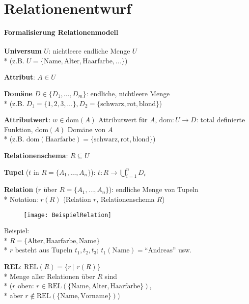 \section{Relationenentwurf}
\label{sec:relationenentwurf}

\paragraph{Formalisierung Relationenmodell}
\begin{items}
	\item \textbf{Universum} \( U \): nichtleere endliche Menge \( U \)\\* (z.B. \( U= \{ \text{Name}, \text{Alter}, \text{Haarfarbe}, \dots \} \))
	\item \textbf{Attribut}: \( A \in U \)
	\item \textbf{Domäne} \( D \in \{ D_1, \dots, D_m \} \): endliche, nichtleere Menge \\* (z.B. \( D_1 = \{ 1,2,3,\dots \}, D_2 = \{ \text{schwarz}, \text{rot}, \text{blond} \} \))
	\item \textbf{Attributwert}: \( w \in \text{dom}(A) \) Attributwert für \( A \), \( \text{dom}: U \to D \): total definierte Funktion, \( \text{dom}(A) \) Domäne von \( A \) \\* (z.B. \( \text{dom}(\text{Haarfarbe}) = \{ \text{schwarz}, \text{rot}, \text{blond} \} \))
	\item \textbf{Relationenschema}: \( R \subseteq U \)
	\item \textbf{Tupel} (\( t \) in \( R = \{ A_1, \dots, A_n \} \)): \( t: R \to \bigcup_{i=1}^n D_i \)
	\item \textbf{Relation} (\( r \) über \( R = \{ A_1, \dots, A_n \} \)): endliche Menge von Tupeln \\* Notation: \( r(R) \) (Relation \( r \), Relationenschema \( R \))
	\begin{figure}[H]\centering\label{BeispielRelation}\texttt{[image: BeispielRelation]}\end{figure}
	\item Beispiel: \\* \( R = \{ \text{Alter}, \text{Haarfarbe}, \text{Name} \} \) \\* \( r \) besteht aus Tupeln \( t_1, t_2, t_3 \); \( t_1(\text{Name}) = \text{``Andreas''} \) usw.
	\item \textbf{REL}: \( \text{REL}(R) = \{ r \mid r(R) \} \) \\* Menge aller Relationen über \( R \) sind \\* (\( r \) oben: \( r \in \text{REL}(\{ \text{Name}, \text{Alter}, \text{Haarfarbe} \}) \), \\* aber \( r \not \in \text{REL}(\{ \text{Name}, \text{Vorname} \}) \))

\end{items}
